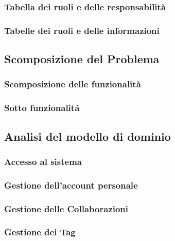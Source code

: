 \documentclass{article}
\begin{document}
\subsubsection{Tabella dei ruoli e delle responsabilità}

\subsubsection{Tabelle dei ruoli e delle informazioni}

\pagebreak

\subsection{Scomposizione del Problema}
\subsubsection{Scomposizione delle funzionalità}

\subsubsection{Sotto funzionalitá}


\subsection{Analisi del modello di dominio}
\subsubsection{Accesso al sistema}

\subsubsection{Gestione dell'account personale}

\subsubsection{Gestione delle Collaborazioni}

\subsubsection{Gestione dei Tag}

\end{document}
